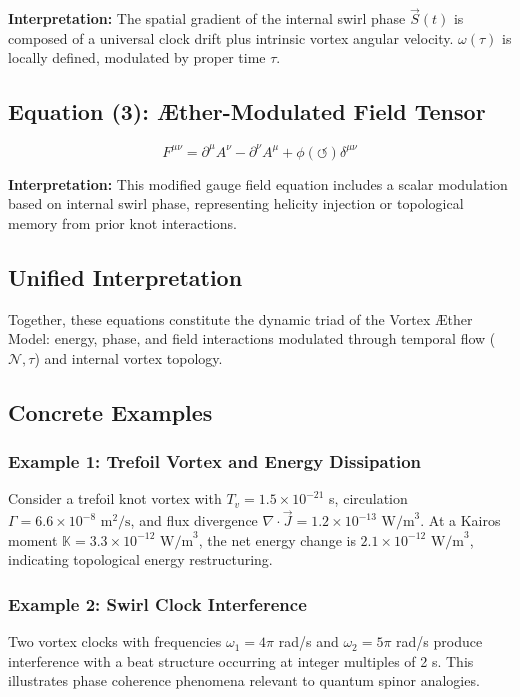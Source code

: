 \documentclass[preprint]{revtex4-2}
\begin{document}
\textbf{Interpretation:} The spatial gradient of the internal swirl phase $\vec{S}(t)$ is composed of a universal clock drift plus intrinsic vortex angular velocity. $\omega(\tau)$ is locally defined, modulated by proper time $\tau$.

\subsection*{Equation (3): Æther-Modulated Field Tensor}
\begin{equation}
    F^{\mu\nu} = \partial^\mu A^\nu - \partial^\nu A^\mu + \phi(\circlearrowleft) \delta^{\mu\nu}
\label{eq:Æther_modulated_field_tensor}
\end{equation}

\textbf{Interpretation:} This modified gauge field equation includes a scalar modulation based on internal swirl phase, representing helicity injection or topological memory from prior knot interactions.

\subsection*{Unified Interpretation}
Together, these equations constitute the dynamic triad of the Vortex Æther Model: energy, phase, and field interactions modulated through temporal flow ($\mathcal{N}, \tau$) and internal vortex topology.

\subsection*{Concrete Examples}

\subsubsection*{Example 1: Trefoil Vortex and Energy Dissipation}
Consider a trefoil knot vortex with $T_v = 1.5 \times 10^{-21}$ s, circulation $\Gamma = 6.6 \times 10^{-8} \text{ m}^2/\text{s}$, and flux divergence $\nabla \cdot \vec{J} = 1.2 \times 10^{-13} \text{ W/m}^3$. At a Kairos moment $\mathbb{K} = 3.3 \times 10^{-12} \text{ W/m}^3$, the net energy change is $2.1 \times 10^{-12} \text{ W/m}^3$, indicating topological energy restructuring.

\subsubsection*{Example 2: Swirl Clock Interference}
Two vortex clocks with frequencies $\omega_1 = 4\pi$ rad/s and $\omega_2 = 5\pi$ rad/s produce interference with a beat structure occurring at integer multiples of 2 s. This illustrates phase coherence phenomena relevant to quantum spinor analogies.
\end{document}
